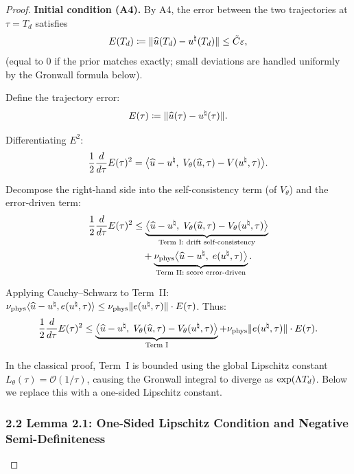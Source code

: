 \begin{proof}
\textbf{Initial condition (A4).} By A4, the error between the two trajectories at $\tau = T_d$ satisfies
\begin{equation}
  E(T_d) \coloneqq \lVert \widehat{u}(T_d) - u^{\natural}(T_d) \rVert \leq \tilde{C}\varepsilon,
\end{equation}
(equal to $0$ if the prior matches exactly; small deviations are handled uniformly by the Gronwall formula below).

Define the trajectory error:
\begin{equation}
  E(\tau) \coloneqq \lVert \widehat{u}(\tau) - u^{\natural}(\tau) \rVert.
\end{equation}

Differentiating $E^2$:
\begin{equation}
  \frac{1}{2}\frac{d}{d\tau} E(\tau)^2
  = \bigl\langle \widehat{u} - u^{\natural},\; V_\theta(\widehat{u}, \tau) - V(u^{\natural}, \tau) \bigr\rangle.
\end{equation}

Decompose the right-hand side into the self-consistency term (of $V_\theta$) and the error-driven term:
\begin{align}
  \frac{1}{2}\frac{d}{d\tau} E(\tau)^2
  &\leq \underbrace{\bigl\langle \widehat{u} - u^{\natural},\; V_\theta(\widehat{u},\tau) - V_\theta(u^{\natural},\tau) \bigr\rangle}_{\text{Term~I: drift self-consistency}} \\
  &\quad + \underbrace{\nu_{\mathrm{phys}} \bigl\langle \widehat{u} - u^{\natural},\; e(u^{\natural},\tau) \bigr\rangle}_{\text{Term~II: score error-driven}}.\notag
\end{align}

Applying Cauchy--Schwarz to Term~II:
$\nu_{\mathrm{phys}} \langle \widehat{u} - u^{\natural}, e(u^{\natural},\tau) \rangle \leq \nu_{\mathrm{phys}} \lVert e(u^{\natural},\tau) \rVert \cdot E(\tau)$.
Thus:
\begin{equation}
  \frac{1}{2}\frac{d}{d\tau} E(\tau)^2
  \leq \underbrace{\bigl\langle \widehat{u} - u^{\natural},\; V_\theta(\widehat{u},\tau) - V_\theta(u^{\natural},\tau) \bigr\rangle}_{\text{Term~I}} + \nu_{\mathrm{phys}} \lVert e(u^{\natural},\tau) \rVert \cdot E(\tau).
\end{equation}

In the classical proof, Term~I is bounded using the global Lipschitz constant $L_\theta(\tau) = \mathcal{O}(1/\tau)$, causing the Gronwall integral to diverge as $\exp(\Lambda T_d)$.
Below we replace this with a one-sided Lipschitz constant.

\subsubsection{2.2 Lemma 2.1: One-Sided Lipschitz Condition and Negative Semi-Definiteness}


\end{proof}
